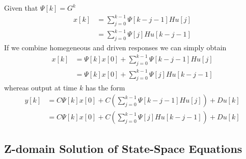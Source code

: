 \documentclass[twoside]{article}
\begin{document}
%
Given that $\Psi[k] = G^k$
%
\begin{align*}
    x[k] &= \sum\limits_{j = 0}^{k-1} \Psi[k-j-1] H u[j]
\\
&= \sum\limits_{j = 0}^{k-1} \Psi[j] H u[k-j-1]
\end{align*}
%
If we combine homegeneous and driven responses we can simply obtain
%
\begin{align*}
    x[k] &= \Psi[k] x[0] + \sum\limits_{j = 0}^{k-1} \Psi[k-j-1] H u[j]
\\
&= \Psi[k] x[0] + \sum\limits_{j = 0}^{k-1} \Psi[j] H u[k-j-1]
\end{align*}
% 
whereas output at time $k$ has the form
%
\begin{align*}
    y[k] &= C \Psi[k] x[0] + C \left( \sum\limits_{j = 0}^{k-1}
           \Psi[k-j-1] H u[j] \right) + D u[k]
\\
&= C \Psi[k] x[0] + C \left( \sum\limits_{j = 0}^{k-1} \Psi[j] H
  u[k-j-1] \right) +  D u[k]
\end{align*}
% 

\subsection*{Z-domain Solution of State-Space Equations}
\end{document}
